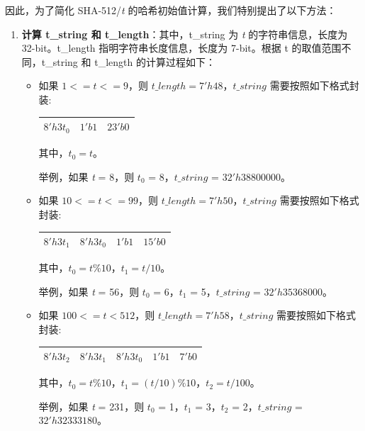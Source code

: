 \documentclass[main\_\_CN.tex]{subfiles}
\begin{document}
因此，为了简化 SHA-512/{\it{t}} 的哈希初始值计算，我们特别提出了以下方法：

\begin{enumerate}\label{sha-512/t}
    \item \textbf{计算 t\_string 和 t\_length}：其中，t\_string 为 {\it{t}} 的字符串信息，长度为 32-bit。t\_length 指明字符串长度信息，长度为 7-bit。根据 t 的取值范围不同，t\_string 和 t\_length 的计算过程如下：

    \begin{itemize}
        \item 如果 $1<=t<=9$，则 $t\_length=7'h48$，$t\_string$ 需要按照如下格式封装:\\
        \begin{longtable}[c]{|p{2cm}|p{1cm}|p{3cm}|}
        \hline
        $8'h3t_0$ & $1'b1$ & $23'b0$\\
        \hline
        \end{longtable}
        其中，$t_0=t$。

        举例，如果 {\it{t}} = 8，则 $t_0$ = 8，$t\_string$ = $32'h38800000$。

        \item 如果 $10<=t<=99$，则 $t\_length=7'h50$，$t\_string$ 需要按照如下格式封装:\\

        \begin{longtable}[c]{|p{1.5cm}|p{1.5cm}|p{1cm}|p{2.5cm}|}
        \hline
        $8'h3t_1$ & $8'h3t_0$ & $1'b1$ & $15'b0$\\
        \hline
        \end{longtable}
        其中，$t_0=t\%10$，$t_1=t/10$。

        举例，如果 {\it{t}} = 56，则 $t_0$ = 6，$t_1$ = 5，$t\_string$ = $32'h35368000$。

        \item 如果 $100<=t<512$，则 $t\_length=7'h58$，$t\_string$ 需要按照如下格式封装:\\

        \begin{longtable}[c]{|p{1.5cm}|p{1.5cm}|p{1.5cm}|p{1cm}|p{1.5cm}|}
        \hline
        $8'h3t_2$ & $8'h3t_1$ & $8'h3t_0$ & $1'b1$ & $7'b0$\\
        \hline
        \end{longtable}
        其中，$t_0=t\%10$，$t_1=(t/10)\%10$，$t_2=t/100$。

        举例，如果 {\it{t}} = 231，则 $t_0$ = 1，$t_1$ = 3，$t_2$ = 2，$t\_string$ = $32'h32333180$。


\end{itemize}
\end{enumerate}
\end{document}
